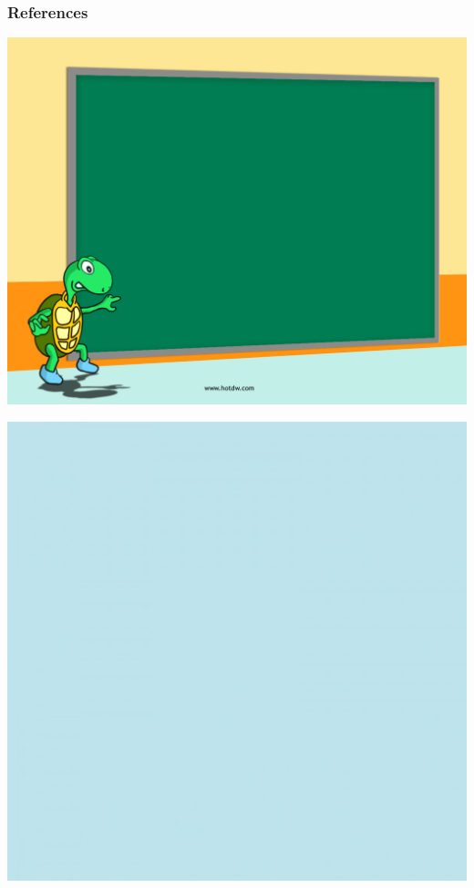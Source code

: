 \documentclass[mathserif, handout]{beamer}
\begin{document}
\begin{frame}[allowframebreaks]
  \frametitle{References}
  \scriptsize{}
  
\end{frame}

\usebackgroundtemplate
{
  \includegraphics[width=\paperwidth,height=\paperheight]{lastpage.jpg}%
}
\begin{frame}


  \vspace{2em}


\end{frame}


\usebackgroundtemplate
{
  \includegraphics[width=\paperwidth,height=\paperheight]{background.jpg}%
}
\end{document}
